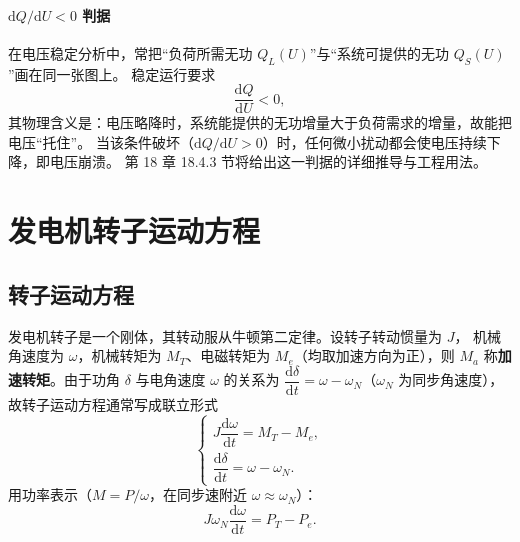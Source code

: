 \paragraph{$\mathrm{d}Q/\mathrm{d}U<0$ 判据}
在电压稳定分析中，常把“负荷所需无功 $Q_L(U)$”与“系统可提供的无功 $Q_S(U)$”画在同一张图上。
稳定运行要求
\begin{equation}
  \frac{\mathrm{d}Q}{\mathrm{d}U}<0 ,
\end{equation}
其物理含义是：电压略降时，系统能提供的无功增量大于负荷需求的增量，故能把电压“托住”。
当该条件破坏（$\mathrm{d}Q/\mathrm{d}U>0$）时，任何微小扰动都会使电压持续下降，即电压崩溃。
第 18 章 18.4.3 节将给出这一判据的详细推导与工程用法。


\section{发电机转子运动方程}

\subsection{转子运动方程}

发电机转子是一个刚体，其转动服从牛顿第二定律。设转子转动惯量为 $J$，
机械角速度为 $\omega$，机械转矩为 $M_T$、电磁转矩为 $M_e$（均取加速方向为正），则
$M_a$ 称\textbf{加速转矩}。由于功角 $\delta$ 与电角速度 $\omega$ 的关系为
$\dfrac{\mathrm{d}\delta}{\mathrm{d}t}=\omega-\omega_N$（$\omega_N$ 为同步角速度），
故转子运动方程通常写成联立形式
\begin{equation}
  \begin{cases}
    J\dfrac{\mathrm{d}\omega}{\mathrm{d}t}=M_T-M_e,\\[4pt]
    \dfrac{\mathrm{d}\delta}{\mathrm{d}t}=\omega-\omega_N .
  \end{cases}
\end{equation}
用功率表示（$M=P/\omega$，在同步速附近 $\omega\approx\omega_N$）：
\begin{equation}
  J\omega_N\frac{\mathrm{d}\omega}{\mathrm{d}t}=P_T-P_e .
\end{equation}

